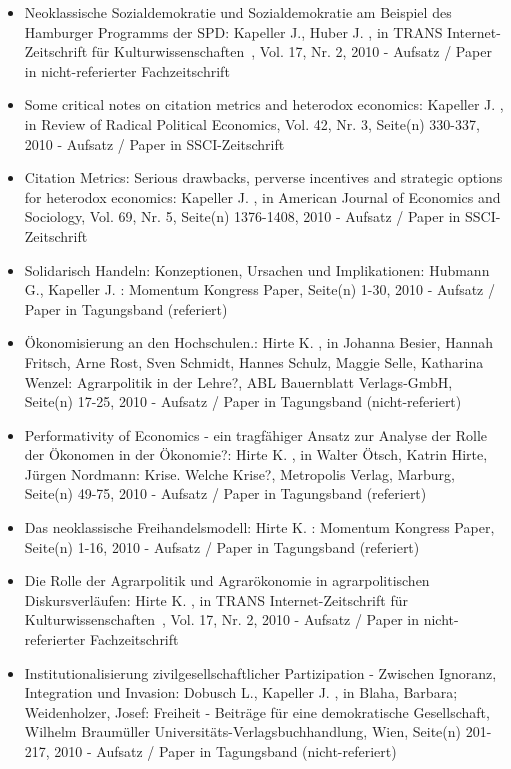 \begin{itemize}
	 \item Neoklassische Sozialdemokratie und Sozialdemokratie am Beispiel des Hamburger Programms der SPD: Kapeller J., Huber J. , in TRANS Internet-Zeitschrift für Kulturwissenschaften , Vol. 17, Nr. 2, 2010 - Aufsatz / Paper in nicht-referierter Fachzeitschrift
	 \item Some critical notes on citation metrics and heterodox economics: Kapeller J. , in Review of Radical Political Economics, Vol. 42, Nr. 3, Seite(n) 330-337, 2010 - Aufsatz / Paper in SSCI-Zeitschrift
	 \item Citation Metrics: Serious drawbacks, perverse incentives and strategic options for heterodox economics: Kapeller J. , in American Journal of Economics and Sociology, Vol. 69, Nr. 5, Seite(n) 1376-1408, 2010 - Aufsatz / Paper in SSCI-Zeitschrift
	 \item Solidarisch Handeln: Konzeptionen, Ursachen und Implikationen: Hubmann G., Kapeller J. : Momentum Kongress Paper, Seite(n) 1-30, 2010 - Aufsatz / Paper in Tagungsband (referiert)
	 \item Ökonomisierung an den Hochschulen.: Hirte K. , in Johanna Besier, Hannah Fritsch, Arne Rost, Sven Schmidt, Hannes Schulz, Maggie Selle, Katharina Wenzel: Agrarpolitik in der Lehre?, ABL Bauernblatt Verlags-GmbH, Seite(n) 17-25, 2010 - Aufsatz / Paper in Tagungsband (nicht-referiert)
	 \item Performativity of Economics - ein tragfähiger Ansatz zur Analyse der Rolle der Ökonomen in der Ökonomie?: Hirte K. , in Walter Ötsch, Katrin Hirte, Jürgen Nordmann: Krise. Welche Krise?, Metropolis Verlag, Marburg, Seite(n) 49-75, 2010 - Aufsatz / Paper in Tagungsband (referiert)
	 \item Das neoklassische Freihandelsmodell: Hirte K. : Momentum Kongress Paper, Seite(n) 1-16, 2010 - Aufsatz / Paper in Tagungsband (referiert)
	 \item Die Rolle der Agrarpolitik und Agrarökonomie in agrarpolitischen Diskursverläufen: Hirte K. , in TRANS Internet-Zeitschrift für Kulturwissenschaften , Vol. 17, Nr. 2, 2010 - Aufsatz / Paper in nicht-referierter Fachzeitschrift
	 \item Institutionalisierung zivilgesellschaftlicher Partizipation - Zwischen Ignoranz, Integration und Invasion: Dobusch L., Kapeller J. , in Blaha, Barbara; Weidenholzer, Josef: Freiheit - Beiträge für eine demokratische Gesellschaft, Wilhelm Braumüller Universitäts-Verlagsbuchhandlung, Wien, Seite(n) 201-217, 2010 - Aufsatz / Paper in Tagungsband (nicht-referiert)
\end{itemize} 
